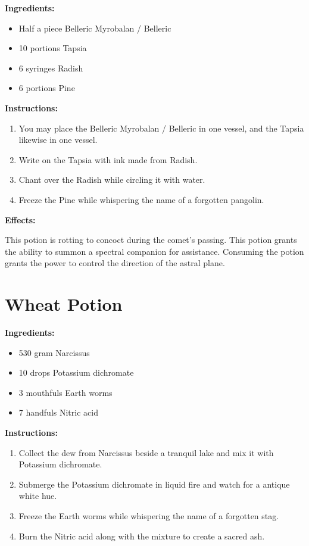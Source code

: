 \documentclass{article}
\begin{document}
\textbf{Ingredients:}

\begin{itemize}
  \item Half a piece Belleric Myrobalan / Belleric
  \item 10 portions Tapsia
  \item 6 syringes Radish
  \item 6 portions Pine
\end{itemize}

\textbf{Instructions:}

\begin{enumerate}
  \item You may place the Belleric Myrobalan / Belleric in one vessel, and the Tapsia likewise in one vessel.
  \item Write on the Tapsia with ink made from Radish.
  \item Chant over the Radish while circling it with water.
  \item Freeze the Pine while whispering the name of a forgotten pangolin.
\end{enumerate}

\textbf{Effects:}

This potion is rotting to concoct during the comet’s passing. This potion grants the ability to summon a spectral companion for assistance. Consuming the potion grants the power to control the direction of the astral plane.

\newpage
\section*{Wheat Potion}

\textbf{Ingredients:}

\begin{itemize}
  \item 530 gram Narcissus
  \item 10 drops Potassium dichromate
  \item 3 mouthfuls Earth worms
  \item 7 handfuls Nitric acid
\end{itemize}

\textbf{Instructions:}

\begin{enumerate}
  \item Collect the dew from Narcissus beside a tranquil lake and mix it with Potassium dichromate.
  \item Submerge the Potassium dichromate in liquid fire and watch for a antique white hue.
  \item Freeze the Earth worms while whispering the name of a forgotten stag.
  \item Burn the Nitric acid along with the mixture to create a sacred ash.
\end{enumerate}
\end{document}
